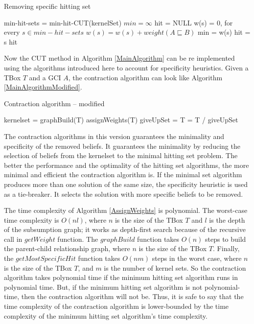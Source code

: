 \documentclass{sfuthesis}
\theoremstyle{plain}
\theoremstyle{definition}
\begin{document}
\begin{algorithm}
\caption{Removing specific hitting set}
\label{RemoveSpecific}
\begin{algorithmic}[1]
\State min-hit-sets = min-hit-CUT(kernelSet)
\State $min = \infty$
\State hit = NULL
\State w(s) = 0, for every $s \in min-hit-sets$
\State $w(s) = w(s) + weight(A \sqsubseteq B)$
\EndFor
{}
\State min = w(s)
\State hit = s
\EndIf
\EndFor
\State
\Return hit
\EndFunction
\end{algorithmic}
\end{algorithm}

Now the CUT method in Algorithm \ref{MainAlgorithm} can be re implemented using the algorithms introduced here to account for specificity heuristics. Given a TBox $T$ and a GCI $A$, the contraction algorithm can look like Algorithm \ref{MainAlgorithmModified}.

\begin{algorithm}
\caption{Contraction algorithm -- modified}
\label{MainAlgorithmModified}
\begin{algorithmic}[1]
\State kernelset = 
\State graphBuild(T)
\State assignWeights(T)
\State giveUpSet = 
\State T = T / giveUpSet
\EndProcedure
\end{algorithmic}
\end{algorithm}

The contraction algorithms in this version guarantees the minimality and specificity of the removed beliefs. It guarantees the minimality by reducing the selection of beliefs from the kernelset to the minimal hitting set problem. The better the performance and the optimality of the hitting set algorithms, the more minimal and efficient the contraction algorithm is. If the minimal set algorithm produces more than one solution of the same size, the specificity heuristic is used as a tie-breaker. It selects the solution with more specific beliefs to be removed.

The time complexity of Algorithm \ref{AssignWeights} is polynomial. The worst-case time complexity is $O(nl)$, where $n$ is the size of the TBox $T$ and $l$ is the depth of the subsumption graph; it works as depth-first search because of the recursive call in $getWeight$ function. The $graphBuild$ function takes $O(n)$ steps to build the parent-child relationship graph, where $n$ is the size of the TBox $T$. Finally, the $getMostSpecificHit$ function takes $O(nm)$ steps in the worst case, where $n$ is the size of the TBox $T$, and $m$ is the number of kernel sets. So the contraction algorithm takes polynomial time if the minimum hitting set algorithm runs in polynomial time. But, if the minimum hitting set algorithm is not polynomial-time, then the contraction algorithm will not be. Thus, it is safe to say that the time complexity of the contraction algorithm is lower-bounded by the time complexity of the minimum hitting set algorithm's time complexity.
\end{document}
